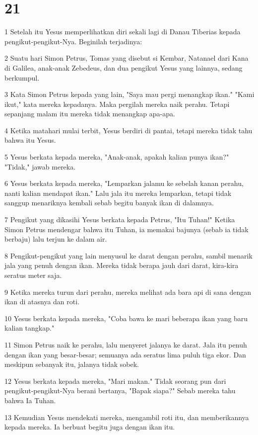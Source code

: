\chapter{21}

\par 1 Setelah itu Yesus memperlihatkan diri sekali lagi di Danau Tiberias kepada pengikut-pengikut-Nya. Beginilah terjadinya:
\par 2 Suatu hari Simon Petrus, Tomas yang disebut si Kembar, Natanael dari Kana di Galilea, anak-anak Zebedeus, dan dua pengikut Yesus yang lainnya, sedang berkumpul.
\par 3 Kata Simon Petrus kepada yang lain, "Saya mau pergi menangkap ikan." "Kami ikut," kata mereka kepadanya. Maka pergilah mereka naik perahu. Tetapi sepanjang malam itu mereka tidak menangkap apa-apa.
\par 4 Ketika matahari mulai terbit, Yesus berdiri di pantai, tetapi mereka tidak tahu bahwa itu Yesus.
\par 5 Yesus berkata kepada mereka, "Anak-anak, apakah kalian punya ikan?" "Tidak," jawab mereka.
\par 6 Yesus berkata kepada mereka, "Lemparkan jalamu ke sebelah kanan perahu, nanti kalian mendapat ikan." Lalu jala itu mereka lemparkan, tetapi tidak sanggup menariknya kembali sebab begitu banyak ikan di dalamnya.
\par 7 Pengikut yang dikasihi Yesus berkata kepada Petrus, "Itu Tuhan!" Ketika Simon Petrus mendengar bahwa itu Tuhan, ia memakai bajunya (sebab ia tidak berbaju) lalu terjun ke dalam air.
\par 8 Pengikut-pengikut yang lain menyusul ke darat dengan perahu, sambil menarik jala yang penuh dengan ikan. Mereka tidak berapa jauh dari darat, kira-kira seratus meter saja.
\par 9 Ketika mereka turun dari perahu, mereka melihat ada bara api di sana dengan ikan di atasnya dan roti.
\par 10 Yesus berkata kepada mereka, "Coba bawa ke mari beberapa ikan yang baru kalian tangkap."
\par 11 Simon Petrus naik ke perahu, lalu menyeret jalanya ke darat. Jala itu penuh dengan ikan yang besar-besar; semuanya ada seratus lima puluh tiga ekor. Dan meskipun sebanyak itu, jalanya tidak sobek.
\par 12 Yesus berkata kepada mereka, "Mari makan." Tidak seorang pun dari pengikut-pengikut-Nya berani bertanya, "Bapak siapa?" Sebab mereka tahu bahwa Ia Tuhan.
\par 13 Kemudian Yesus mendekati mereka, mengambil roti itu, dan memberikannya kepada mereka. Ia berbuat begitu juga dengan ikan itu.
